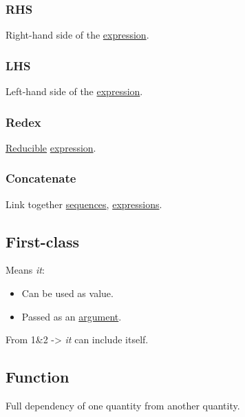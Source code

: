 \documentclass[11pt]{article}
\begin{document}
\subsubsection{\label{org88f5d62}RHS}
\label{sec:orgb1d3e2c}
Right-hand side of the \hyperref[org9021dd7]{expression}.\\

\subsubsection{\label{orgf575de7}LHS}
\label{sec:orga84cdfe}
Left-hand side of the \hyperref[org9021dd7]{expression}.\\

\subsubsection{\label{orga17c573}Redex}
\label{sec:orgb412f04}
\hyperref[org433cf42]{Reducible} \hyperref[org9021dd7]{expression}.\\

\subsubsection{\label{org6d5ea65}Concatenate}
\label{sec:org1ab9f85}
Link together \hyperref[orga383401]{sequences}, \hyperref[org3731c99]{expressions}.\\

\subsection{\label{orgf359a4c}First-class}
\label{sec:orgb8f5f49}
Means \emph{it}:\\
\begin{itemize}
\item Can be used as value.\\
\item Passed as an \hyperref[orga6b7e97]{argument}.\\
\end{itemize}
From 1\&2 -> \emph{it} can include itself.\\

\subsection{\label{orge15bc14}Function}
\label{sec:orgbbf9e95}
Full dependency of one quantity from another quantity.\\
\end{document}
